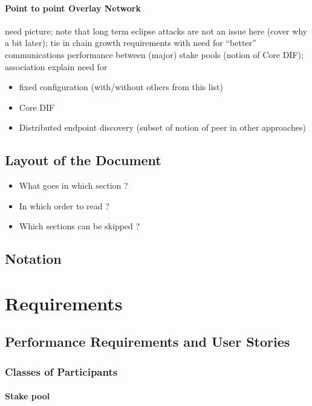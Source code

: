 \documentclass{report}
\newcommand{\wip}[1]{\color{magenta}{#1}\color{black}}
\theoremstyle{definition}{
  \newtheorem{lemma}{Lemma}[section] %
  \newtheorem{definition}[lemma]{Definition}
}
\theoremstyle{theorem}{
  \newtheorem{invariant}[lemma]{Invariant}
  \newtheorem{proofobligation}[lemma]{Proof Obligation}
}
\numberwithin{equation}{lemma}
\begin{document}
\subsubsection{Point to point Overlay Network}
need picture; note that long term eclipse attacks are not an issue
here (cover why a bit later); tie in chain growth requirements with
need for ``better'' communications performance between (major)
stake pools (notion of Core DIF); association explain need for
\begin{itemize}
\item fixed configuration (with/without others from this list)
\item Core DIF
\item Distributed endpoint discovery (subset of notion of peer in
  other approaches)
\end{itemize}

  
\section{Layout of the Document}

\begin{itemize}
  \item What goes in which section ?
  \item In which order to read ?
  \item Which sections can be skipped ?
\end{itemize}

\section{Notation}

\chapter{Requirements}

\section{Performance Requirements and User Stories}
\subsection{Classes of Participants}
\wip{todo: make a nice table}

\subsubsection{Stake pool} %
\end{document}
